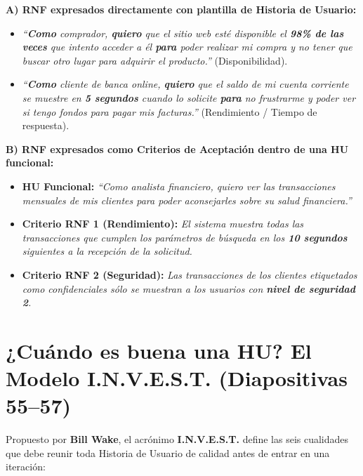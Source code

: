 \begin{ejemplo}
\textbf{A) RNF expresados directamente con plantilla de Historia de Usuario:}
\begin{itemize}[itemsep=2pt]
    \item \textit{``\textbf{Como} comprador, \textbf{quiero} que el sitio web esté disponible el \textbf{98\% de las veces} que intento acceder a él \textbf{para} poder realizar mi compra y no tener que buscar otro lugar para adquirir el producto.''} (Disponibilidad).
    \item \textit{``\textbf{Como} cliente de banca online, \textbf{quiero} que el saldo de mi cuenta corriente se muestre en \textbf{5 segundos} cuando lo solicite \textbf{para} no frustrarme y poder ver si tengo fondos para pagar mis facturas.''} (Rendimiento / Tiempo de respuesta).
\end{itemize}

\textbf{B) RNF expresados como Criterios de Aceptación dentro de una HU funcional:}
\begin{itemize}[itemsep=2pt]
    \item \textbf{HU Funcional:} \textit{``Como analista financiero, quiero ver las transacciones mensuales de mis clientes para poder aconsejarles sobre su salud financiera.''}
    \item \textbf{Criterio RNF 1 (Rendimiento):} \textit{El sistema muestra todas las transacciones que cumplen los parámetros de búsqueda en los \textbf{10 segundos} siguientes a la recepción de la solicitud.}
    \item \textbf{Criterio RNF 2 (Seguridad):} \textit{Las transacciones de los clientes etiquetados como confidenciales sólo se muestran a los usuarios con \textbf{nivel de seguridad 2}.}
\end{itemize}
\end{ejemplo}

\section{¿Cuándo es buena una HU? El Modelo I.N.V.E.S.T. (Diapositivas 55--57)}

Propuesto por \textbf{Bill Wake}, el acrónimo \textbf{I.N.V.E.S.T.} define las seis cualidades que debe reunir toda Historia de Usuario de calidad antes de entrar en una iteración:

